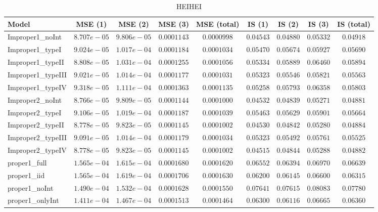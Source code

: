 \begin{table}

\caption{\label{tab:model-choice-sc7}HEIHEI}
\centering
\begin{tabular}{lcccccccc}
\hline
Model  & MSE (1) & MSE (2) & MSE (3) & MSE (total) & IS (1) & IS (2) & IS (3) & \multicolumn{1}{c}{IS (total)} \\ 
\hline
Improper1_noInt  & $8.707e-05$ & $9.806e-05$ & $0.0001143$ & $0.0000998$ & $0.04543$ & $0.04880$ & $0.05332$ & $0.04918$ \\
Improper1_typeI  & $9.024e-05$ & $1.017e-04$ & $0.0001184$ & $0.0001034$ & $0.05470$ & $0.05674$ & $0.05927$ & $0.05690$ \\
Improper1_typeII  & $8.808e-05$ & $1.031e-04$ & $0.0001255$ & $0.0001056$ & $0.05334$ & $0.05889$ & $0.06460$ & $0.05894$ \\
Improper1_typeIII  & $9.021e-05$ & $1.014e-04$ & $0.0001177$ & $0.0001031$ & $0.05323$ & $0.05546$ & $0.05821$ & $0.05563$ \\
Improper1_typeIV  & $9.318e-05$ & $1.111e-04$ & $0.0001363$ & $0.0001135$ & $0.05258$ & $0.05793$ & $0.06358$ & $0.05803$ \\
Improper2_noInt  & $8.766e-05$ & $9.809e-05$ & $0.0001144$ & $0.0001000$ & $0.04532$ & $0.04839$ & $0.05271$ & $0.04881$ \\
Improper2_typeI  & $9.106e-05$ & $1.019e-04$ & $0.0001187$ & $0.0001039$ & $0.05463$ & $0.05629$ & $0.05901$ & $0.05664$ \\
Improper2_typeII  & $8.778e-05$ & $9.823e-05$ & $0.0001145$ & $0.0001002$ & $0.04530$ & $0.04842$ & $0.05280$ & $0.04884$ \\
Improper2_typeIII  & $9.091e-05$ & $1.014e-04$ & $0.0001179$ & $0.0001034$ & $0.05323$ & $0.05492$ & $0.05761$ & $0.05525$ \\
Improper2_typeIV  & $8.778e-05$ & $9.823e-05$ & $0.0001145$ & $0.0001002$ & $0.04515$ & $0.04844$ & $0.05288$ & $0.04882$ \\
proper1_full  & $1.565e-04$ & $1.615e-04$ & $0.0001680$ & $0.0001620$ & $0.06552$ & $0.06394$ & $0.06970$ & $0.06639$ \\
proper1_iid  & $1.565e-04$ & $1.619e-04$ & $0.0001706$ & $0.0001630$ & $0.06200$ & $0.06145$ & $0.06600$ & $0.06315$ \\
proper1_noInt  & $1.490e-04$ & $1.532e-04$ & $0.0001628$ & $0.0001550$ & $0.07641$ & $0.07615$ & $0.08083$ & $0.07780$ \\
proper1_onlyInt  & $1.411e-04$ & $1.467e-04$ & $0.0001513$ & $0.0001464$ & $0.06300$ & $0.06116$ & $0.06665$ & $0.06360$ \\

\end{tabular}
\end{table}
